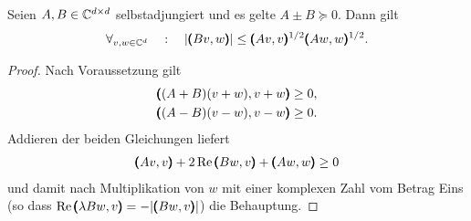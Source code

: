 \begin{lem}
	Seien $A,B\in\mathbb C^{d\times d}$ selbstadjungiert und es gelte $A\pm B \succeq 0$. Dann gilt
	\begin{align}
		\forall_{v,w \in \mathbb{C}^d} \quad: \quad \vert \pmb(Bv,w\pmb) \vert \le \pmb(Av,v\pmb)^{{1}/{2}}\pmb(Aw,w\pmb)^{{1}/{2}}. 
	\end{align}
\end{lem}
\begin{proof}
	Nach Voraussetzung gilt
	\begin{align}\begin{split}
		&\pmb((A+B)(v+w),v+w\pmb) \ge 0,\\
		&\pmb((A-B)(v-w),v-w\pmb) \ge 0.
		\end{split}
	\end{align}
	Addieren der beiden Gleichungen liefert
	\begin{align}
		\pmb(Av,v\pmb)+2\operatorname{Re} \pmb(Bw,v\pmb) +\pmb(Aw,w\pmb) \ge 0
	\end{align}
	und damit nach Multiplikation von $w$ mit einer komplexen Zahl vom Betrag Eins (so dass $\operatorname{Re} \pmb(\lambda Bw,v\pmb) = - | \pmb(Bw,v\pmb)|$) die Behauptung. 
\end{proof}



